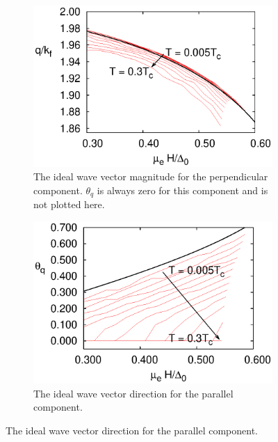 \documentclass[usletter,aps,prb,10pt,amssymb,amsmath,twocolumn]{revtex4-1}
\begin{document}
 \begin{figure}
\caption{behavior of $\bf q^*$}\label{fig:integrand}
        \centering
        \begin{subfigure}[b]{0.23\textwidth}

                \includegraphics[width=\textwidth]{./figures/max_q_x.eps}
                \caption{The ideal wave vector magnitude for the perpendicular component. $\theta_q$ is always zero for this component and is not plotted here.}
        \end{subfigure}
         \begin{subfigure}[b]{0.23\textwidth}

                \includegraphics[width=\textwidth]{./figures/max_p_z.eps}
                \caption{The ideal wave vector direction for the parallel component. }
        \end{subfigure}


\end{figure}
\end{document}
